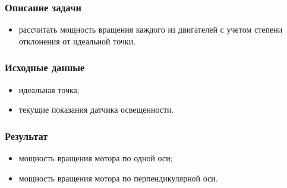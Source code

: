 \subsubsection*{Описание задачи}
\begin{itemize}
\item рассчитать мощность вращения каждого из двигателей с учетом степени отклонения от идеальной точки.	
\end{itemize}


\subsubsection*{Исходные данные}
\begin{itemize}
\item идеальная точка;
\item текущие показания датчика освещенности.	
\end{itemize}

\subsubsection*{Результат}
\begin{itemize}
\item мощность вращения мотора по одной оси;
\item мощность вращения мотора по перпендикулярной оси.	
\end{itemize}



